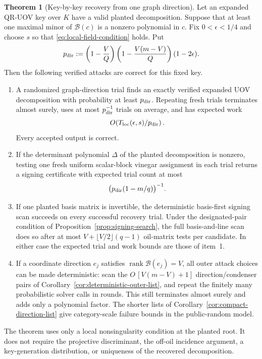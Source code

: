 \documentclass[11pt,a4paper]{article}
\theoremstyle{definition}
\newtheorem{theorem}{Theorem}[section]
\theoremstyle{remark}
\newcommand{\rank}{\operatorname{rank}}
\newcommand{\QRUOV}{\textsf{QR-UOV}}
\begin{document}
\begin{theorem}[Key-by-key recovery from one graph direction]\label{thm:graph-attack}
Let an expanded \QRUOV{} key over $K$ have a valid planted decomposition.  Suppose that at least one maximal minor of $\mathcal B(c)$ is a nonzero polynomial in $c$.  Fix $0<\epsilon<1/4$ and choose $s$ so that \eqref{eq:local-field-condition} holds.  Put
\[
 p_{\rm dir}:=\left(1-\frac VQ\right)
 \left(1-\frac{V(m-V)}Q\right)(1-2\epsilon).
\]
Then the following verified attacks are correct for this fixed key.
\begin{enumerate}
\item A randomized graph-direction trial finds an exactly verified expanded UOV decomposition with probability at least $p_{\rm dir}$.  Repeating fresh trials terminates almost surely, uses at most $p_{\rm dir}^{-1}$ trials on average, and has expected work
\begin{equation}\label{eq:local-expected-decomposition}
 O\!\left(T_{\rm loc}(\epsilon,s)/p_{\rm dir}\right).
\end{equation}
Every accepted output is correct.

\item If the determinant polynomial $\Delta$ of the planted decomposition is nonzero, testing one fresh uniform scalar-block vinegar assignment in each trial returns a signing certificate with expected trial count at most
\begin{equation}\label{eq:local-functional-trials}
 \bigl(p_{\rm dir}(1-m/q)\bigr)^{-1}.
\end{equation}

\item If one planted basis matrix is invertible, the deterministic basis-first signing scan succeeds on every successful recovery trial.  Under the designated-pair condition of Proposition~\ref{prop:signing-search}, the full basis-and-line scan does so after at most $V+\lfloor V/2\rfloor(q-1)$ oil-matrix tests per candidate.  In either case the expected trial and work bounds are those of item~1.

\item If a coordinate direction $e_j$ satisfies $\rank\mathcal B(e_j)=V$, all outer attack choices can be made deterministic: scan the $O\,[V(m-V)+1]$ direction/condenser pairs of Corollary~\ref{cor:deterministic-outer-list}, and repeat the finitely many probabilistic solver calls in rounds.  This still terminates almost surely and adds only a polynomial factor.  The shorter lists of Corollary~\ref{cor:compact-direction-list} give category-scale failure bounds in the public-random model.
\end{enumerate}
The theorem uses only a local nonsingularity condition at the planted root.  It does not require the projective discriminant, the off-oil incidence argument, a key-generation distribution, or uniqueness of the recovered decomposition.
\end{theorem}
\end{document}
